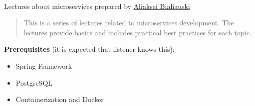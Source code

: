 \documentclass[nobrand,anonymous,nodate,nosecurity]{../solvd}
\begin{document}
{
    \\
    Lectures about microservices prepared by \href{https://h1alexbel.github.io/about-me.html}{Aliaksei Bialiauski}

    \begin{abstract}
        This is a series of lectures related to microservices development.
        The lectures provide basics and includes practical best practices for each topic.
    \end{abstract}

    \textbf{Prerequisites} (it is expected that listener knows this):
    \begin{itemize}
        \item Spring Framework
        \item PostgreSQL
        \item Containerization and Docker
    \end{itemize}

}
\end{document}
